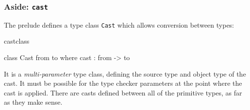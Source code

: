 \subsubsection*{Aside: \texttt{cast}}

The prelude defines a type class \texttt{Cast} which allows conversion between
types:

\begin{SaveVerbatim}{castclass}

class Cast from to where
    cast : from -> to

\end{SaveVerbatim}

\noindent
It is a \emph{multi-parameter} type class, defining the source type and object
type of the cast. It must be possible for the type checker 
parameters at the point where the cast is applied.
There are casts defined between all of the primitive types, as far as
they make sense.


